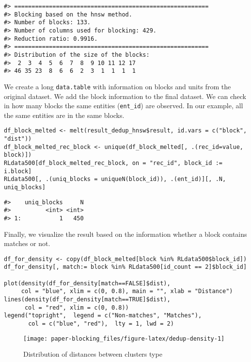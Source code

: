 \begin{verbatim}
#> ========================================================
#> Blocking based on the hnsw method.
#> Number of blocks: 133.
#> Number of columns used for blocking: 429.
#> Reduction ratio: 0.9916.
#> ========================================================
#> Distribution of the size of the blocks:
#>  2  3  4  5  6  7  8  9 10 11 12 17 
#> 46 35 23  8  6  6  2  3  1  1  1  1
\end{verbatim}

We create a long \texttt{data.table} with information on blocks and units from
the original dataset. We add the block information to the final dataset.
We can check in how many blocks the same entities (\texttt{ent\_id}) are
observed. In our example, all the same entities are in the same blocks.

\begin{verbatim}
df_block_melted <- melt(result_dedup_hnsw$result, id.vars = c("block", "dist"))
df_block_melted_rec_block <- unique(df_block_melted[, .(rec_id=value, block)])
RLdata500[df_block_melted_rec_block, on = "rec_id", block_id := i.block]
RLdata500[, .(uniq_blocks = uniqueN(block_id)), .(ent_id)][, .N, uniq_blocks]
\end{verbatim}

\begin{verbatim}
#>    uniq_blocks     N
#>          <int> <int>
#> 1:           1   450
\end{verbatim}

Finally, we visualize the result based on the information whether a
block contains matches or not.

\begin{verbatim}
df_for_density <- copy(df_block_melted[block %in% RLdata500$block_id])
df_for_density[, match:= block %in% RLdata500[id_count == 2]$block_id]

plot(density(df_for_density[match==FALSE]$dist),
     col = "blue", xlim = c(0, 0.8), main = "", xlab = "Distance")
lines(density(df_for_density[match==TRUE]$dist),
      col = "red", xlim = c(0, 0.8))
legend("topright",  legend = c("Non-matches", "Matches"), 
       col = c("blue", "red"),  lty = 1, lwd = 2)
\end{verbatim}

\begin{figure}[H]

{\centering \texttt{[image: paper-blocking\_files/figure-latex/dedup-density-1]} 

}

\caption{Distribution of distances between clusters type}\label{fig:dedup-density}
\end{figure}

